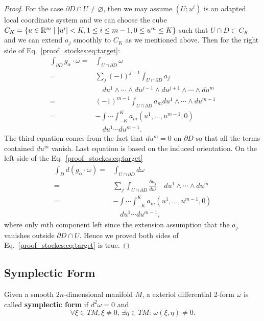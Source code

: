 \begin{proof}
For the case $\partial D\cap U\ne\varnothing$, then we may assume $(U;u^i)$ is an adapted local coordinate system and we can choose the cube $C_K=\{u\in\mathbb{R}^m\mid |u^i|<K,1\le i\le m-1,0\le u^m\le K\}$ such that $U\cap D\subset C_K$ and we can extend $a_j$ smoothly to $C_K$ as we mentioned above. Then for the right side of Eq.~\ref{proof_stockes:eq:target}:
\begin{equation*}
\begin{aligned}
\int_{\partial D}g_\alpha\cdot\omega=&\int_{U\cap \partial D}\omega\\
=&\sum_j(-1)^{j-1}\int_{U\cap \partial D}a_j\\
&\quad du^1\wedge\cdots\wedge du^{j-1}\wedge du^{j+1}\wedge\cdots\wedge du^m\\
=&(-1)^{m-1}\int_{U\cap \partial D}a_mdu^1\wedge\cdots\wedge du^{m-1}\\
=&-\int\cdots\int_{-K}^Ka_m(u^1,\dots,u^{m-1},0)\\
&\quad du^1\cdots du^{m-1}.
\end{aligned}
\end{equation*}
The third equation comes from the fact that $du^m=0$ on $\partial D$ so that all the terms contained $du^m$ vanish. Last equation is based on the induced orientation. 
On the left side of the Eq.~\ref{proof_stockes:eq:target}
\begin{equation*}
\begin{aligned}
\int_{D}d(g_\alpha\cdot\omega)=&\int_{U\cap \partial D}d\omega\\
=&\sum_j\int_{U\cap \partial D}\frac{\partial a_j}{du^j}\quad du^1\wedge\cdots\wedge du^m\\
=&-\int\cdots\int_{-K}^Ka_m(u^1,\dots,u^{m-1},0)\\
&\quad du^1\cdots du^{m-1},
\end{aligned}
\end{equation*}
where only $m$th component left since the extension assumption that the $a_j$ vanishes outside $\partial D\cap U$. Hence we proved both sides of Eq.~\ref{proof_stockes:eq:target} is true.
\end{proof}


\subsection{Symplectic Form}

\begin{definition}
Given a smooth $2n$-dimensional manifold $M$, a exteriol differential 2-form $\omega$ is called \textbf{symplectic form} if $d^2\omega=0$ and
\begin{equation}
\forall\xi\in TM,\xi\ne 0,\,\exists \eta\in TM:\, \omega(\xi,\eta)\ne0.
\end{equation}
\end{definition}

